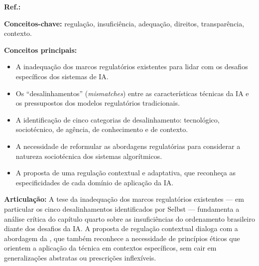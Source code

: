 \begin{fichamento}
    \textbf{Ref.:} \cite{Selbst2018TIR}
    
    \textbf{Conceitos-chave:} regulação, insuficiência, adequação, direitos, transparência, contexto.
    
    \textbf{Conceitos principais:}
    \begin{itemize}
        \item A inadequação dos marcos regulatórios existentes para lidar com os desafios específicos dos sistemas de IA.
        \item Os ``desalinhamentos'' (\textit{mismatches}) entre as características técnicas da IA e os pressupostos dos modelos regulatórios tradicionais.
        \item A identificação de cinco categorias de desalinhamento: tecnológico, sociotécnico, de agência, de conhecimento e de contexto.
        \item A necessidade de reformular as abordagens regulatórias para considerar a natureza sociotécnica dos sistemas algorítmicos.
        \item A proposta de uma regulação contextual e adaptativa, que reconheça as especificidades de cada domínio de aplicação da IA.
    \end{itemize}
    
    \textbf{Articulação:} A tese da inadequação dos marcos regulatórios existentes — em particular os cinco desalinhamentos identificados por Selbst — fundamenta a análise crítica do capítulo quarto sobre as insuficiências do ordenamento brasileiro diante dos desafios da IA. A proposta de regulação contextual dialoga com a abordagem da \MH{}, que também reconhece a necessidade de princípios éticos que orientem a aplicação da técnica em contextos específicos, sem cair em generalizações abstratas ou prescrições inflexíveis.
\end{fichamento}

